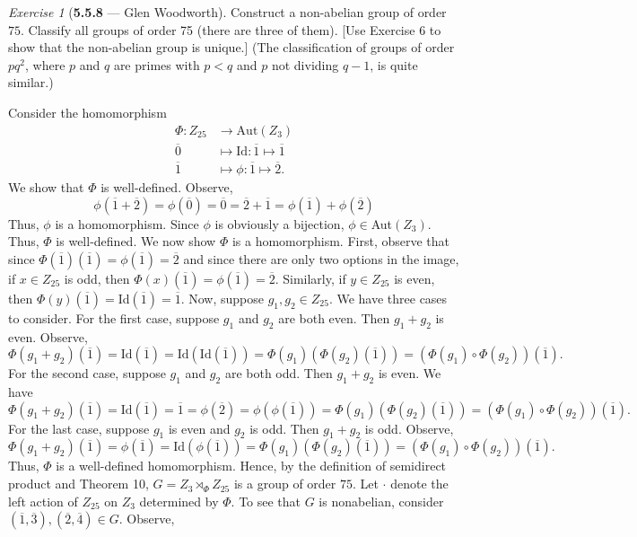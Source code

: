 \documentclass[12pt]{amsart}
\makeatletter
\theoremstyle{remark}
\newtheorem*{exercise}{Exercise}%
\renewenvironment{proof}[1][\proofname]{\par\doublespacing
  \pushQED{\qed}%
  \normalfont \topsep6\p@\@plus6\p@\relax
  \list{}{%
    \settowidth{\leftmargin}{\itshape\proofname:\hskip\labelsep}%
    \setlength{\labelwidth}{0pt}%
    \setlength{\itemindent}{-\leftmargin}%
  }%
  \item[\hskip\labelsep\itshape#1\@addpunct{:}]\ignorespaces
}{%
  \popQED\endlist\@endpefalse
  \singlespacing
}
\theoremstyle{mycomment}
\makeatother
\begin{document}
\begin{exercise}[\textbf{5.5.8} --- Glen Woodworth] Construct a non-abelian group of order $75$. Classify all groups of order 75 (there are three of them). [Use Exercise 6 to show that the non-abelian group is unique.] (The classification of groups of order $pq^2$, where $p$ and $q$ are primes with $p<q$ and $p$ not dividing $q-1$, is quite similar.)
  \begin{proof} Consider the homomorphism \begin{align*}\Phi:Z_{25}&\rightarrow\text{Aut}(Z_{3})\\
\overline{0}&\mapsto\text{Id}:\overline{1}\mapsto\overline{1}\\
\overline{1}&\mapsto \phi:\overline{1}\mapsto \overline{2}.
  \end{align*} 
  We show that $\Phi$ is well-defined. Observe,\[\phi(\overline{1}+\overline{2})=\phi(\overline{0})=\overline{0}=\overline{2}+\overline{1}=\phi(\overline{1})+\phi(\overline{2})\]
Thus, $\phi$ is a homomorphism. Since $\phi$ is obviously a bijection, $\phi\in$Aut$(Z_3)$. Thus, $\Phi$ is well-defined. We now show $\Phi$ is a homomorphism. First, observe that since $\Phi(\overline{1})(\overline{1})=\phi(\overline{1})=\overline{2}$ and since there are only two options in the image, if $x\in Z_{25}$ is odd, then $\Phi(x)(\overline{1})=\phi(\overline{1})=\overline{2}$. Similarly, if $y\in Z_{25}$ is even, then $\Phi(y)(\overline{1})=$Id$(\overline{1})=\overline{1}$. Now, suppose $g_1,g_2\in Z_{25}$. We have three cases to consider. For the first case, suppose $g_1$ and $g_2$ are both even. Then $g_1+g_2$ is even. Observe,\[
\Phi(g_1+g_2)(\overline{1})=\text{Id}(\overline{1})=\text{Id}(\text{Id}(\overline{1}))=\Phi(g_1)(\Phi(g_2)(\overline{1}))=(\Phi(g_1)\circ\Phi(g_2))(\overline{1}).\]
For the second case, suppose $g_1$ and $g_2$ are both odd. Then $g_1+g_2$ is even. We have
\[\Phi(g_1+g_2)(\overline{1})=\text{Id}(\overline{1})=\overline{1}=\phi(\overline{2})=\phi(\phi(\overline{1}))=\Phi(g_1)(\Phi(g_2)(\overline{1}))=(\Phi(g_1)\circ\Phi(g_2))(\overline{1}).\]
For the last case, suppose $g_1$ is even and $g_2$ is odd. Then $g_1+g_2$ is odd. Observe,
\[\Phi(g_1+g_2)(\overline{1})=\phi(\overline{1})=\text{Id}(\phi(\overline{1}))=\Phi(g_1)(\Phi(g_2)(\overline{1}))=(\Phi(g_1)\circ\Phi(g_2))(\overline{1}).\]
Thus, $\Phi$ is a well-defined homomorphism. Hence, by the definition of semidirect product and Theorem 10, $G=Z_3\rtimes_\Phi Z_{25}$ is a group of order $75$. Let $\cdot$ denote the left action of $Z_{25}$ on $Z_3$ determined by $\Phi.$ To see that $G$ is nonabelian, consider $(\overline{1},\overline{3}),(\overline{2},\overline{4})\in G$. Observe,

\end{proof}
\end{exercise}
\end{document}
